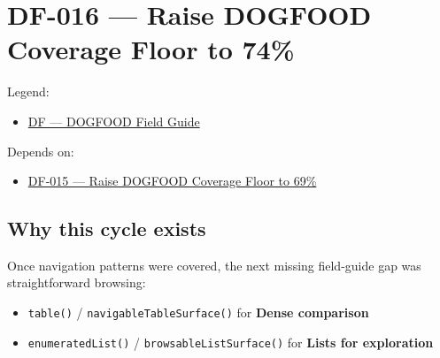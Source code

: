 \chapter{DF-016 --- Raise DOGFOOD Coverage Floor to 74\%}\label{record-078}

\smallskip

Legend:

\begin{itemize}
\tightlist
\item
  \href{https://github.com/flyingrobots/bijou/blob/1853ad902f6bf219326409e7f743a5a1d6517dbc/docs/legends/DF-dogfood-field-guide.md}{DF --- DOGFOOD Field Guide}
\end{itemize}

Depends on:

\begin{itemize}
\tightlist
\item
  \href{https://github.com/flyingrobots/bijou/blob/cbd70612140e7a450d764b3c7be1c6af878b99bc/docs/design/DF-015-raise-dogfood-coverage-floor-to-69-percent.md}{DF-015 --- Raise DOGFOOD Coverage Floor to 69\%}
\end{itemize}

\section{Why this cycle exists}\label{record-078-why-this-cycle-exists}

Once navigation patterns were covered, the next missing field-guide gap was straightforward browsing:

\begin{itemize}
\tightlist
\item
  \texttt{t\allowbreak{}a\allowbreak{}b\allowbreak{}l\allowbreak{}e\allowbreak{}(\allowbreak{})} / \texttt{n\allowbreak{}a\allowbreak{}v\allowbreak{}i\allowbreak{}g\allowbreak{}a\allowbreak{}b\allowbreak{}l\allowbreak{}e\allowbreak{}T\allowbreak{}a\allowbreak{}b\allowbreak{}l\allowbreak{}e\allowbreak{}S\allowbreak{}u\allowbreak{}r\allowbreak{}f\allowbreak{}a\allowbreak{}c\allowbreak{}e\allowbreak{}(\allowbreak{})} for \textbf{Dense comparison}
\item
  \texttt{e\allowbreak{}n\allowbreak{}u\allowbreak{}m\allowbreak{}e\allowbreak{}r\allowbreak{}a\allowbreak{}t\allowbreak{}e\allowbreak{}d\allowbreak{}L\allowbreak{}i\allowbreak{}s\allowbreak{}t\allowbreak{}(\allowbreak{})} / \texttt{b\allowbreak{}r\allowbreak{}o\allowbreak{}w\allowbreak{}s\allowbreak{}a\allowbreak{}b\allowbreak{}l\allowbreak{}e\allowbreak{}L\allowbreak{}i\allowbreak{}s\allowbreak{}t\allowbreak{}S\allowbreak{}u\allowbreak{}r\allowbreak{}f\allowbreak{}a\allowbreak{}c\allowbreak{}e\allowbreak{}(\allowbreak{})} for \textbf{Lists for exploration}
\end{itemize}

